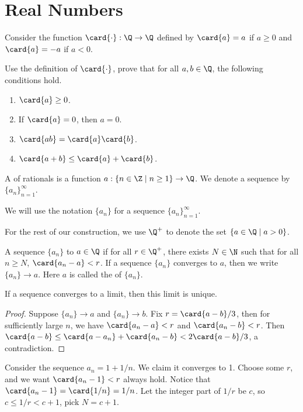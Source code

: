 \documentclass[10pt]{article}
\begin{document}
\section{Real Numbers}
Consider the function $\card{\cdot}:\Q\to\Q$ defined by $\card{a}=a$ if $a\ge 0$ and $\card{a}=-a$ if $a<0$.
\begin{problem}
    Use the definition of $\card{\cdot}$, prove that for all $a,b\in\Q$, the following conditions hold.
    \begin{enumerate}
        \item $\card{a}\ge 0$.
        \item If $\card{a}=0$, then $a=0$.
        \item $\card{ab}=\card{a}\card{b}$.
        \item $\card{a+b}\le\card{a}+\card{b}$.
    \end{enumerate}
\end{problem}
\begin{definition}
    A  of rationals is a function $a:\{n\in\Z\mid n\ge 1\}\to\Q$. We denote a sequence by ${\{{a}_{n}\}}_{n=1}^{\infty}$.
\end{definition}
\begin{remark}
    We will use the notation $\{{a}_{n}\}$ for a sequence ${\{{a}_{n}\}}_{n=1}^{\infty}$.
\end{remark}
\begin{remark}
    For the rest of our construction, we use ${\Q}^{+}$ to denote the set $\{a\in\Q\mid a>0\}$.
\end{remark}
\begin{definition}
    A sequence $\{{a}_{n}\}$  to $a\in\Q$ if for all $r\in{\Q}^{+}$, there exists $N\in\N$ such that for all $n\ge N$, $\card{{a}_{n}-a}<r$. If a sequence $\{{a}_{n}\}$ converges to $a$, then we write $\{{a}_{n}\}\to a$. Here $a$ is called the  of $\{{a}_{n}\}$.
\end{definition}
\begin{proposition}
    If a sequence converges to a limit, then this limit is unique.
\end{proposition}
\begin{proof}
    Suppose $\{{a}_{n}\}\to a$ and $\{{a}_{n}\}\to b$. Fix $r=\card{a-b}/3$, then for sufficiently large $n$, we have $\card{{a}_{n}-a}<r$ and $\card{{a}_{n}-b}<r$. Then $\card{a-b}\le\card{a-{a}_{n}}+\card{{a}_{n}-b}<2\card{a-b}/3$, a contradiction.
\end{proof}
\begin{example}
    Consider the sequence ${a}_{n}=1+1/n$. We claim it converges to 1. Choose some $r$, and we want $\card{{a}_{n}-1}<r$ always hold. Notice that $\card{{a}_{n}-1}=\card{1/n}=1/n$. Let the integer part of $1/r$ be $c$, so $c\le 1/r<c+1$, pick $N=c+1$.
\end{example}
\end{document}

